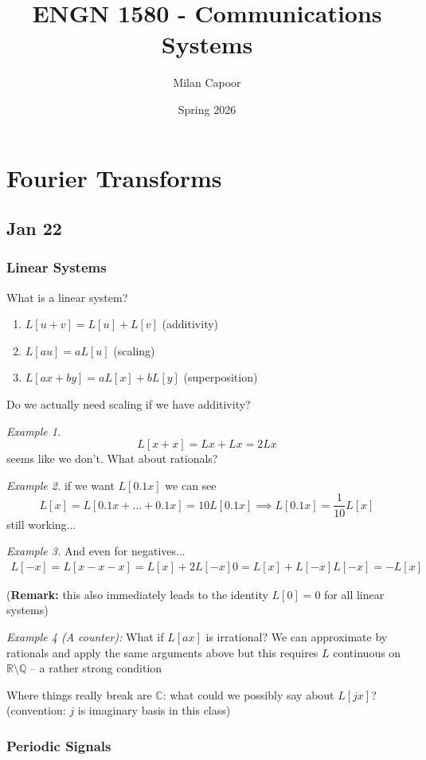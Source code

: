 \documentclass[12pt]{report}
\title{ ENGN 1580 - Communications Systems}
\author{Milan Capoor}
\date{Spring 2026}
\newcommand{\R}{\mathbb{R}}
\newcommand{\Q}{\mathbb{Q}}
\newcommand{\C}{\mathbb{C}}
\newcommand*{\tbf}[1]{\ifmmode\mathbf{#1}\else\textbf{#1}\fi}
\begin{document}
\maketitle

\chapter{Fourier Transforms}
\section{Jan 22}

\subsection{Linear Systems}

What is a linear system? 
\begin{enumerate}
    \item $L[u+v] = L[u]+L[v]$ (additivity)
    \item $L[au] = aL[u]$ (scaling) 
    \item $L[ax + by] = aL[x] + bL[y]$ (superposition)
\end{enumerate}

Do we actually need scaling if we have additivity?

\emph{Example 1.} 
\[ L[x+x]= Lx + Lx = 2Lx \]
seems like  we don't. What about rationals?

\emph{Example 2.} if we want $L[0.1x]$ we can see 
\[L[x]= L[0.1x + \dots + 0.1x] = 10L[0.1x] \implies L[0.1x] = \frac{1}{10}L[x] \]
still working... 

\emph{Example 3.} And even for negatives...
\begin{gather*}
    L[-x]=L[x-x-x]=L[x]+2L[-x]
    0 = L[x]+L[-x]
    L[-x] = -L[x]
\end{gather*}

(\tbf{Remark:} this also immediately leads to the identity $L[0]=0$ for all linear systems)

\emph{Example 4 (A counter):} What if $L[ax]$ is irrational? We can approximate by rationals and apply the same arguments above but this requires $L$ continuous on $\R \setminus \Q$ -- a rather strong condition 

Where things really break are $\C$: what could we possibly say about $L[jx]$? (convention: $j$ is imaginary basis in this class)

\subsection{Periodic Signals}
\end{document}
